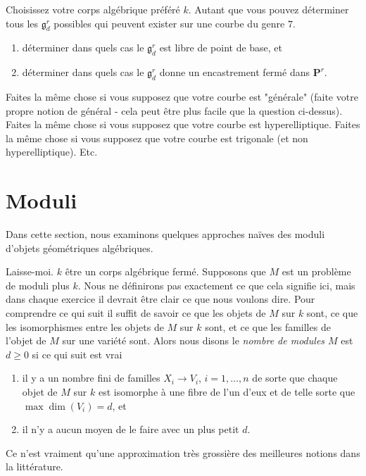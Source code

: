 \begin{exercise}
\label{exercise-genus-7}
Choisissez votre corps algébrique préféré $k$. Autant
que vous pouvez déterminer tous les $\mathfrak g^r_d$
possibles qui peuvent exister sur une
courbe du genre $7$.
\begin{enumerate}
\item déterminer dans quels cas le $\mathfrak g^r_d$ est libre de point de base, et
\item déterminer dans quels cas le $\mathfrak g^r_d$ donne un
encastrement fermé dans $\mathbf{P}^r$.
\end{enumerate}
Faites la même chose si vous supposez que votre courbe est "générale"
(faite votre propre notion de général - cela peut être plus facile que la question ci-dessus).
Faites la même chose si vous supposez que votre courbe est hyperelliptique.
Faites la même chose si vous supposez que votre courbe
est trigonale (et non hyperelliptique). Etc.
\end{exercise}





\section{Moduli}
\label{section-moduli}

\noindent
Dans cette section, nous examinons quelques approches naïves des
moduli d'objets géométriques algébriques.

\medskip\noindent
Laisse-moi. $k$ être un corps algébrique fermé. Supposons que $M$ est un problème de
moduli plus $k$. Nous ne définirons pas exactement ce que cela signifie ici, mais
dans chaque exercice il devrait être clair ce que nous voulons dire.
Pour comprendre ce qui suit il suffit de savoir ce
que les objets de $M$ sur $k$ sont, ce que les isomorphismes entre les objets
de $M$ sur $k$ sont, et ce que les familles de l'objet de $M$
sur une variété sont. Alors nous disons le {\it nombre de modules $M$} est $d
\geq 0$ si ce qui suit est vrai
\begin{enumerate}
\item il y a un nombre fini de familles $X_i \to V_i$, $i = 1, \ldots, n$
de sorte que chaque objet de $M$ sur $k$ est isomorphe à une fibre de l'un
d'eux et de telle sorte que $\max \dim(V_i) = d$, et
\item il n'y a aucun moyen de le faire avec un plus petit $d$.
\end{enumerate}
Ce n'est vraiment qu'une approximation très grossière des meilleures notions dans
la littérature.

